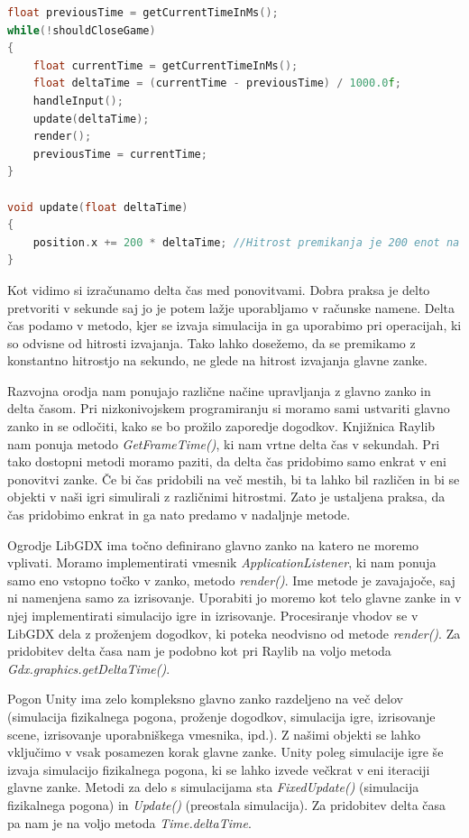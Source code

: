 \documentclass[12pt,a4paper,twoside]{book}
\begin{document}
\begin{lstlisting}[label=code:deltaTime, language=C++, caption=Neodvisno gibanje]
float previousTime = getCurrentTimeInMs();
while(!shouldCloseGame)
{
	float currentTime = getCurrentTimeInMs();
	float deltaTime = (currentTime - previousTime) / 1000.0f;
	handleInput();
	update(deltaTime);
	render();
	previousTime = currentTime;
}

void update(float deltaTime)
{
	position.x += 200 * deltaTime; //Hitrost premikanja je 200 enot na sekundo
}
\end{lstlisting}
Kot vidimo si izračunamo delta čas med ponovitvami. Dobra praksa je delto pretvoriti v sekunde saj jo je potem lažje uporabljamo v računske namene. Delta čas podamo v metodo, kjer se izvaja simulacija in ga uporabimo pri operacijah, ki so odvisne od hitrosti izvajanja. Tako lahko dosežemo, da se premikamo z konstantno hitrostjo na sekundo, ne glede na hitrost izvajanja glavne zanke.

Razvojna orodja nam ponujajo različne načine upravljanja z glavno zanko in delta časom. Pri nizkonivojskem programiranju si moramo sami ustvariti glavno zanko in se odločiti, kako se bo prožilo zaporedje dogodkov. Knjižnica Raylib nam ponuja metodo \textit{GetFrameTime()}, ki nam vrtne delta čas v sekundah. Pri tako dostopni metodi moramo paziti, da delta čas pridobimo samo enkrat v eni ponovitvi zanke. Če bi čas pridobili na več mestih, bi ta lahko bil različen in bi se objekti v naši igri simulirali z različnimi hitrostmi. Zato je ustaljena praksa, da čas pridobimo enkrat in ga nato predamo v nadaljnje metode.

Ogrodje LibGDX ima točno definirano glavno zanko na katero ne moremo vplivati. Moramo implementirati vmesnik \textit{ApplicationListener}, ki nam ponuja samo eno vstopno točko v zanko, metodo \textit{render()}. Ime metode je zavajajoče, saj ni namenjena samo za izrisovanje. Uporabiti jo moremo kot telo glavne zanke in v njej implementirati simulacijo igre in izrisovanje. Procesiranje vhodov se v LibGDX dela z proženjem dogodkov, ki poteka neodvisno od metode \textit{render()}. Za pridobitev delta časa nam je podobno kot pri Raylib na voljo metoda \textit{Gdx.graphics.getDeltaTime()}.

Pogon Unity ima zelo kompleksno glavno zanko razdeljeno na več delov (simulacija fizikalnega pogona, proženje dogodkov, simulacija igre, izrisovanje scene, izrisovanje uporabniškega vmesnika, ipd.). Z našimi objekti se lahko vključimo v vsak posamezen korak glavne zanke. Unity poleg simulacije igre še izvaja simulacijo fizikalnega pogona, ki se lahko izvede večkrat v eni iteraciji glavne zanke. Metodi za delo s simulacijama sta \textit{FixedUpdate()} (simulacija fizikalnega pogona) in \textit{Update()} (preostala simulacija). Za pridobitev delta časa pa nam je na voljo metoda \textit{Time.deltaTime}.
\end{document}
